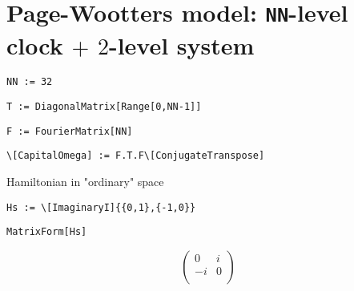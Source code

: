 \section{Page-Wootters model: \texttt{NN}-level clock $+$ $2$-level system}

\begin{lstlisting}
NN := 32
\end{lstlisting}

\begin{lstlisting}
T := DiagonalMatrix[Range[0,NN-1]]
\end{lstlisting}

\begin{lstlisting}
F := FourierMatrix[NN]
\end{lstlisting}

\begin{lstlisting}
\[CapitalOmega] := F.T.F\[ConjugateTranspose] 
\end{lstlisting}

Hamiltonian in "ordinary" space
\begin{lstlisting}
Hs := \[ImaginaryI]{{0,1},{-1,0}}
\end{lstlisting}
\begin{lstlisting}
MatrixForm[Hs]
\end{lstlisting}
\[
  \left(
    \begin{array}{cc}
     0 & i \\
     -i & 0 \\
    \end{array}
    \right)
\]

